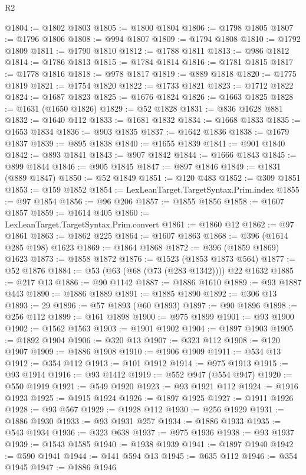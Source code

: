 \begin{lexlean}{R2}
\begin{coremodule}
@1804 := @1802 @1803
@1805 := @1800 @1804
@1806 := @1798 @1805
@1807 := @1796 @1806
@1808 := @994 @1807
@1809 := @1794 @1808
@1810 := @1792 @1809
@1811 := @1790 @1810
@1812 := @1788 @1811
@1813 := @986 @1812
@1814 := @1786 @1813
@1815 := @1784 @1814
@1816 := @1781 @1815
@1817 := @1778 @1816
@1818 := @978 @1817
@1819 := @889 @1818
@1820 := @1775 @1819
@1821 := @1754 @1820
@1822 := @1733 @1821
@1823 := @1712 @1822
@1824 := @1687 @1823
@1825 := @1676 @1824
@1826 := @1663 @1825
@1828 := @1631 (@1650 @1826)
@1829 := @52 @1828
@1831 := @836 @1628 @881
@1832 := @1640 @112
@1833 := @1681 @1832
@1834 := @1668 @1833
@1835 := @1653 @1834
@1836 := @903 @1835
@1837 := @1642 @1836
@1838 := @1679 @1837
@1839 := @895 @1838
@1840 := @1655 @1839
@1841 := @901 @1840
@1842 := @893 @1841
@1843 := @907 @1842
@1844 := @1666 @1843
@1845 := @899 @1844
@1846 := @905 @1845
@1847 := @897 @1846
@1849 := @1831 (@889 @1847)
@1850 := @52 @1849
@1851 := @120 @483
@1852 := @309 @1851
@1853 := @159 @1852
@1854 := LexLeanTarget.TargetSyntax.Prim.index
@1855 := @97 @1854
@1856 := @96 @206
@1857 := @1855 @1856
@1858 := @1607 @1857
@1859 := @1614 @405
@1860 := LexLeanTarget.TargetSyntax.Prim.convert
@1861 := @1860 @12
@1862 := @97 @1861
@1863 := @1862 @225
@1864 := @1607 @1863
@1868 := @396 (@1614 @285 @198) @1623
@1869 := @1864 @1868
@1872 := @396 (@1859 @1869) @1623
@1873 := @1858 @1872
@1876 := @1523 (@1853 @1873 @564)
@1877 := @52 @1876
@1884 := @53 (@63 (@68 (@73 (@283 @1342)))) @22 @1632
@1885 := @217 @13
@1886 := @90 @1142
@1887 := @1886 @1610
@1889 := @93 @1887 @443
@1890 := @1886 @1889
@1891 := @1885 @1890
@1892 := @306 @13
@1893 := 29
@1896 := @57 @1893 (@60 @1893)
@1897 := @90 @1896
@1898 := @256 @112
@1899 := @161 @1898
@1900 := @975 @1899
@1901 := @93 @1900
@1902 := @1562 @1563
@1903 := @1901 @1902
@1904 := @1897 @1903
@1905 := @1892 @1904
@1906 := @320 @13
@1907 := @323 @112
@1908 := @120 @1907
@1909 := @1886 @1908
@1910 := @1906 @1909
@1911 := @534 @13
@1912 := @354 @112
@1913 := @101 @1912
@1914 := @975 @1913
@1915 := @93 @1914
@1916 := @93 @1412
@1919 := @552 @947 (@554 @947)
@1920 := @550 @1919
@1921 := @549 @1920
@1923 := @93 @1921 @112
@1924 := @1916 @1923
@1925 := @1915 @1924
@1926 := @1897 @1925
@1927 := @1911 @1926
@1928 := @93 @567
@1929 := @1928 @112
@1930 := @256 @1929
@1931 := @1886 @1930
@1933 := @93 @1931 @257
@1934 := @1886 @1933
@1935 := @543 @1934
@1936 := @323 @638
@1937 := @975 @1936
@1938 := @93 @1937
@1939 := @1543 @1585
@1940 := @1938 @1939
@1941 := @1897 @1940
@1942 := @590 @1941
@1944 := @141 @594 @13
@1945 := @635 @112
@1946 := @354 @1945
@1947 := @1886 @1946

\end{coremodule}
\end{lexlean}
